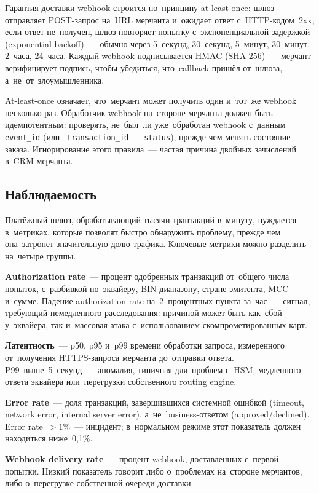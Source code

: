 Гарантия доставки webhook строится по~принципу at-least-once:
шлюз отправляет POST-запрос на~URL мерчанта и~ожидает ответ
с~HTTP-кодом~2xx; если ответ не~получен, шлюз повторяет попытку
с~экспоненциальной задержкой (exponential backoff)~--- обычно
через 5~секунд, 30~секунд, 5~минут, 30~минут, 2~часа, 24~часа.
Каждый webhook подписывается HMAC (SHA-256)~--- мерчант
верифицирует подпись, чтобы убедиться, что~callback пришёл
от~шлюза, а~не~от~злоумышленника.

\begin{practice}
  At-least-once означает, что~мерчант может получить один
  и~тот~же webhook несколько раз. Обработчик webhook на~стороне
  мерчанта должен быть идемпотентным: проверять, не~был~ли
  уже~обработан webhook с~данным \texttt{event\_id} (или~
  \texttt{transaction\_id}~+~\texttt{status}), прежде чем
  менять состояние заказа. Игнорирование этого правила~---
  частая причина двойных зачислений в~CRM мерчанта.
\end{practice}

\subsection*{Наблюдаемость}

Платёжный шлюз, обрабатывающий тысячи транзакций в~минуту,
нуждается в~метриках, которые позволят быстро обнаружить
проблему, прежде чем она~затронет значительную долю трафика.
Ключевые метрики можно разделить на~четыре группы.

\textbf{Authorization rate}~--- процент одобренных транзакций
от~общего числа попыток, с~разбивкой по~эквайеру, BIN-диапазону,
стране эмитента, MCC и~сумме. Падение authorization rate
на~2~процентных пункта за~час~--- сигнал, требующий немедленного
расследования: причиной может быть как~сбой у~эквайера, так
и~массовая атака с~использованием скомпрометированных карт.

\textbf{Латентность}~--- p50, p95 и~p99 времени обработки
запроса, измеренного от~получения HTTPS-запроса мерчанта
до~отправки ответа. P99~выше~5~секунд~--- аномалия, типичная
для~проблем с~HSM, медленного ответа эквайера или~перегрузки
собственного routing engine.

\textbf{Error rate}~--- доля транзакций, завершившихся системной
ошибкой (timeout, network error, internal server error),
а~не~business-ответом (approved/declined). Error rate~$> 1\%$~---
инцидент; в~нормальном режиме этот показатель должен находиться
ниже~0,1\%.

\textbf{Webhook delivery rate}~--- процент webhook, доставленных
с~первой попытки. Низкий показатель говорит либо о~проблемах
на~стороне мерчантов, либо о~перегрузке собственной очереди
доставки.

